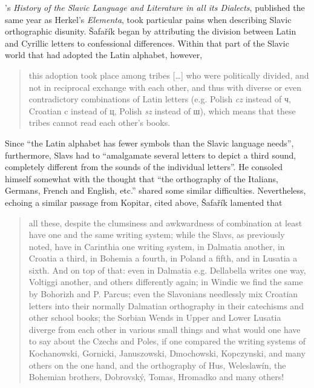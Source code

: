 \citeauthor{safarik_geschichte_1826}’s \citeyear{safarik_geschichte_1826} \textit{History of the Slavic Language and Literature in all its Dialects}, published the same year as Herkel’s \textit{Elementa}, took particular pains when describing Slavic orthographic disunity. Šafařík began by attributing the division between Latin and Cyrillic letters to confessional differences. Within that part of the Slavic world that had adopted the Latin alphabet, however,

\begin{quote}
    this adoption took place among tribes […] who were politically divided, and not in reciprocal exchange with each other, and thus with diverse or even contradictory combinations of Latin letters (e.g. Polish \textit{cz} instead of ч, Croatian c instead of ц, Polish \textit{sz} instead of ш), which means that these tribes cannot read each other’s books. \citep[64--65]{safarik_geschichte_1826}
\end{quote}

\noindent Since “the Latin alphabet has fewer symbols than the Slavic language needs”, furthermore, Slavs had to “amalgamate several letters to depict a third sound, completely different from the sounds of the individual letters”. He consoled himself somewhat with the thought that “the orthography of the Italians, Germans, French and English, etc.” shared some similar difficulties. Nevertheless, echoing a similar passage from Kopitar, cited above, Šafařík lamented that

\begin{quote}
    all these, despite the clumsiness and awkwardness of combination at least have one and the same writing system; while the Slavs, as previously noted, have in Carinthia one writing system, in Dalmatia another, in Croatia a third, in Bohemia a fourth, in Poland a fifth, and in Lusatia a sixth. And on top of that: even in Dalmatia e.g. Dellabella writes one way, Voltiggi another, and others differently again; in Windic we find the same by Bohorizh and P. Parcus; even the Slavonians needlessly mix Croatian letters into their normally Dalmatian orthography in their catechisms and other school books; the Sorbian Wends in Upper and Lower Lusatia diverge from each other in various small things and what would one have to say about the Czechs and Poles, if one compared the writing systems of Kochanowski, Gornicki, Januszowski, Dmochowski, Kopczynski, and many others on the one hand, and the orthography of Hus, Weleslawín, the Bohemian brothers, Dobrovský, Tomas, Hromadko and many others! \citep[65--66]{safarik_geschichte_1826}
\end{quote}

